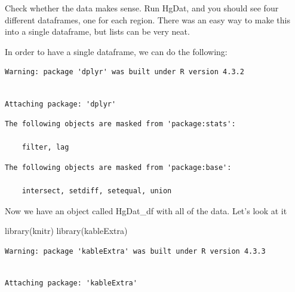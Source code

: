 \documentclass[
  letterpaper,
  DIV=11,
  numbers=noendperiod]{scrartcl}
\newenvironment{Shaded}{\begin{snugshade}}{\end{snugshade}}
\newcommand{\FunctionTok}[1]{\textcolor[rgb]{0.28,0.35,0.67}{#1}}
\newcommand{\NormalTok}[1]{\textcolor[rgb]{0.00,0.23,0.31}{#1}}
\newcommand{\OtherTok}[1]{\textcolor[rgb]{0.00,0.23,0.31}{#1}}
\newcommand{\SpecialCharTok}[1]{\textcolor[rgb]{0.37,0.37,0.37}{#1}}
\begin{document}
Check whether the data makes sense. Run HgDat, and you should see four
different dataframes, one for each region. There was an easy way to make
this into a single dataframe, but lists can be very neat.

In order to have a single dataframe, we can do the following:

\begin{verbatim}
Warning: package 'dplyr' was built under R version 4.3.2
\end{verbatim}

\begin{verbatim}

Attaching package: 'dplyr'
\end{verbatim}

\begin{verbatim}
The following objects are masked from 'package:stats':

    filter, lag
\end{verbatim}

\begin{verbatim}
The following objects are masked from 'package:base':

    intersect, setdiff, setequal, union
\end{verbatim}

\begin{Shaded}
\end{Shaded}

Now we have an object called HgDat\_df with all of the data. Let's look
at it

\begin{Shaded}
\begin{Highlighting}[]
\FunctionTok{library}\NormalTok{(knitr)}
\FunctionTok{library}\NormalTok{(kableExtra)}
\end{Highlighting}
\end{Shaded}

\begin{verbatim}
Warning: package 'kableExtra' was built under R version 4.3.3
\end{verbatim}

\begin{verbatim}

Attaching package: 'kableExtra'
\end{verbatim}
\end{document}
